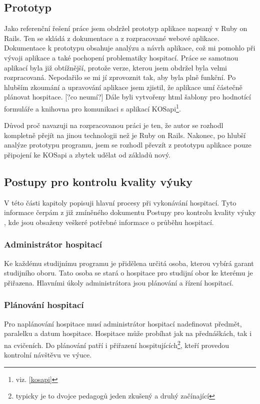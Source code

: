 \subsection{Prototyp}

Jako referenční řešení práce jsem obdržel prototyp aplikace napsaný v Ruby on Rails. Ten se skládá z dokumentace a z rozpracované webové aplikace. Dokumentace k prototypu obsahuje analýzu a návrh aplikace, což  mi pomohlo při vývoji aplikace a také pochopení problematiky hospitací. Práce se samotnou aplikací byla již obtížnější, protože verze, kterou jsem obdržel byla velmi rozpracovaná. Nepodařilo se mi jí zprovoznit tak, aby byla plně funkční. Po hlubším zkoumání a upravování aplikace jsem zjistil, že aplikace umí částečně plánovat hospitace. [?co neumí?] Dále byli vytvořeny html šablony pro hodnotící formuláře a knihovna pro komunikaci s aplikací KOSapi\footnote{viz. \ref{kosapi}}.

Důvod proč navazuji na rozpracovanou práci je ten, že autor se rozhodl kompletně přejít na jinou technologii než je Ruby on Rails. Nakonec, po hlubší analýze prototypu programu, jsem se rozhodl převzít z prototypu aplikace pouze připojení ke KOSapi a zbytek udělat od základů nový. 

\subsection{Postupy pro kontrolu kvality výuky}
V této části kapitoly popisuji hlavní procesy při vykonávání hospitací. Tyto informace čerpám z již zmíněného dokumentu Postupy pro kontrolu kvality výuky \cite{postupy}, kde jsou obsaženy veškeré potřebné informace o průběhu hospitací.

\subsubsection{Administrátor hospitací}
Ke každému studijnímu programu je přidělena určitá osoba, kterou vybírá garant studijního oboru. Tato osoba se stará o hospitace pro studijní obor ke kterému je přiřazena. Hlavními úkoly administrátora jsou plánování a řízení hospitací.

\subsubsection{Plánování hospitací}
Pro naplánování hospitace musí administrátor hospitací nadefinovat předmět, paralelku a datum hospitace. Hospitace může probíhat jak na přednáškách, tak i na cvičeních. Do plánování patří i přiřazení hospitujících\footnote{typicky je to dvojce pedagogů jeden zkušený a druhý začínající}, kteří provedou kontrolní návštěvu ve výuce.

